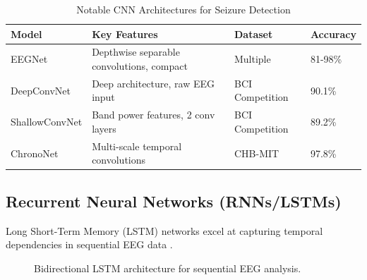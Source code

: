 \documentclass[12pt,a4paper]{article}
\begin{document}
\begin{table}[H]
\centering
\caption{Notable CNN Architectures for Seizure Detection}
\label{tab:cnn_models}
\begin{tabular}{lp{3.5cm}p{3cm}l}
\toprule
\textbf{Model} & \textbf{Key Features} & \textbf{Dataset} & \textbf{Accuracy} \\
\midrule
EEGNet \citep{lawhern2018eegnet} & Depthwise separable convolutions, compact & Multiple & 81-98\% \\
DeepConvNet \citep{schirrmeister2017deep} & Deep architecture, raw EEG input & BCI Competition & 90.1\% \\
ShallowConvNet \citep{schirrmeister2017deep} & Band power features, 2 conv layers & BCI Competition & 89.2\% \\
ChronoNet \citep{roy2019chrononet} & Multi-scale temporal convolutions & CHB-MIT & 97.8\% \\
\bottomrule
\end{tabular}
\end{table}

\subsection{Recurrent Neural Networks (RNNs/LSTMs)}

Long Short-Term Memory (LSTM) networks excel at capturing temporal dependencies in sequential EEG data \citep{tsiouris2018lstm}.

\begin{figure}[H]
\centering
{}
\caption{Bidirectional LSTM architecture for sequential EEG analysis.}
\label{fig:lstm}
\end{figure}
\end{document}
